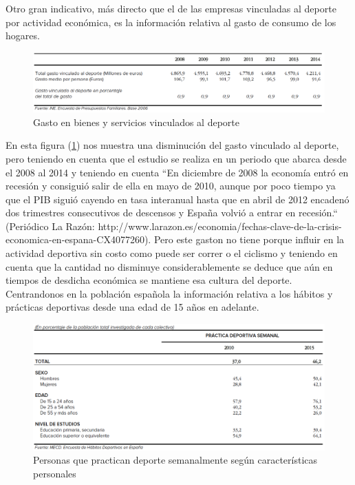 \documentclass[a4paper, 11pt]{article}
\begin{document}
      Otro gran indicativo, más directo que el de las empresas vinculadas al
      deporte por actividad económica, es la información relativa al gasto de
      consumo de los hogares.\\

      \begin{figure}[H]
          \centering
          \includegraphics[width=\textwidth]{Gasto-en-bienes-y-servicios-vinculados-al-deporte}
          \caption{Gasto en bienes y servicios vinculados al deporte}
          \label{f:hogares}
      \end{figure}

      En esta figura (\ref{f:hogares}) nos muestra una disminución del gasto
      vinculado al deporte, pero teniendo en cuenta que el estudio se realiza en
      un periodo que abarca desde el 2008 al 2014 y teniendo en cuenta ``En
      diciembre de 2008 la economía entró en recesión y consiguió salir de ella
      en mayo de 2010, aunque por poco tiempo ya que el PIB siguió cayendo en
      tasa interanual hasta que en abril de 2012 encadenó dos trimestres
      consecutivos de descensos y España volvió a entrar en recesión.`` (Periódico
      La Razón: http://www.larazon.es/economia/fechas-clave-de-la-crisis-economica-en-espana-CX4077260).
      Pero este gaston no tiene porque influir en la actividad deportiva sin costo
      como puede ser correr o el ciclismo y teniendo en cuenta que la cantidad
      no disminuye considerablemente se deduce que aún en tiempos de desdicha
      económica se mantiene esa cultura del deporte.\\

      Centrandonos en la población española la información relativa a los hábitos
      y prácticas deportivas desde una edad de 15 años en adelante.\\

      \begin{figure}[H]
          \centering
          \includegraphics[width=1\textwidth]{Personas-que-practican-deporte-semanalmente-segun-caracteristicas-personales}
          \caption{Personas que practican deporte semanalmente según características personales}
          \label{f:personas}
      \end{figure}
\end{document}
